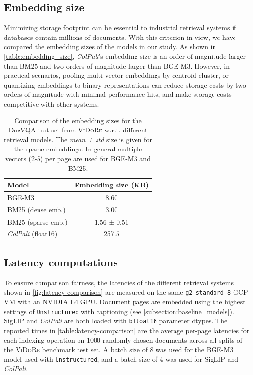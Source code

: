 \subsection{Embedding size}
\label{subsection:embedding_size}

Minimizing storage footprint can be essential to industrial retrieval systems if databases contain millions of documents. With this criterion in view, we have compared the embedding sizes of the models in our study. As shown in \autoref{table:embedding_size}, \textit{ColPali}’s embedding size is an order of magnitude larger than BM25 and two orders of magnitude larger than BGE-M3. However, in practical scenarios, pooling multi-vector embeddings by centroid cluster, or quantizing embeddings to binary representations  can reduce storage costs by two orders of magnitude  with minimal performance hits, and make storage costs competitive with other systems.

\begin{table}[ht]
    \centering
    \begin{tabular}{l|c}
    \textbf{Model}              & \textbf{Embedding size (KB)} \\
    \hline
    BGE-M3             & 8.60               \\
    BM25 (dense emb.)  & 3.00                \\
    BM25 (sparse emb.) & 1.56 ± 0.51         \\
    \textit{ColPali} (float16)            & 257.5              \\
    \end{tabular}
    \caption[DocVQA embedding sizes]{Comparison of the embedding sizes for the DocVQA test set from \textsc{ViDoRe} w.r.t. different retrieval models. The \textit{mean ± std} size is given for the sparse embeddings. In general multiple vectors (2-5) per page are used for BGE-M3 and BM25.}
    \label{table:embedding_size}
\end{table}


\subsection{Latency computations}
\label{paragraph:latency_app} 
To ensure comparison fairness, the latencies of the different retrieval systems shown in \autoref{fig:latency-comparison} are measured on the same \texttt{g2-standard-8} GCP VM with an NVIDIA L4 GPU. Document pages are embedded using the highest settings of \texttt{Unstructured} with captioning (see \autoref{subsection:baseline_models}). SigLIP and \textit{ColPali} are both loaded with \texttt{bfloat16} parameter dtypes. The reported times in \autoref{table:latency-comparison} are the average per-page latencies for each indexing operation on 1000 randomly chosen documents across all splits of the \textsc{ViDoRe} benchmark test set. A batch size of $8$ was used for the BGE-M3 model used with \texttt{Unstructured}, and a batch size of $4$ was used for SigLIP and \textit{ColPali}.

